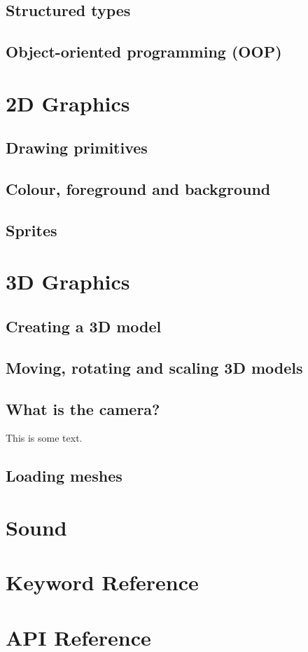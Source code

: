 \documentclass[10pt]{book}
\begin{document}
\section{Structured types}
\section{Object-oriented programming (OOP)}
\chapter{2D Graphics}
\section{Drawing primitives}
\section{Colour, foreground and background}
\section{Sprites}
\chapter{3D Graphics}
\section{Creating a 3D model}
\section{Moving, rotating and scaling 3D models}
\section{What is the camera?}
\label{sec:Camera}
This is some text.
\section{Loading meshes}
\chapter{Sound}
\chapter{Keyword Reference}
\chapter{API Reference}
\end{document}
